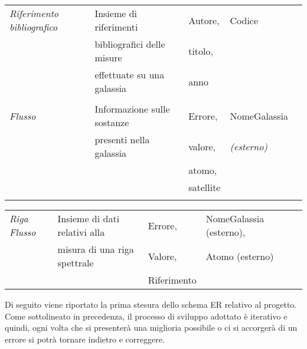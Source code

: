 \documentclass[12pt,a4paper,onecolumn,x11names]{article}
\begin{document}
\begin{table}[h!]
\begin{tabular}{lllll}
%
			\textit{Riferimento bibliografico}	& Insieme di riferimenti  & Autore,		&	Codice				\\
				& bibliografici delle misure  & titolo,		&					\\
			&effettuate su una galassia & anno		&					\\
			&						&				&					\\
			\textit{Flusso}			& Informazione sulle sostanze & Errore, 		& NomeGalassia \\
			& presenti nella galassia	&	valore,		& \textit{(esterno)}\\
			&							& atomo,		&					\\
			&							& satellite	&						\\
			&							&			&						\\
		\end{tabular}
	\end{table}
		
	\begin{table}
	\centering
		\begin{tabular}{lllll}
		\textit{Riga Flusso}	& Insieme di dati relativi alla  & Errore, & NomeGalassia (esterno),\\
		& misura di una riga spettrale & Valore,		&		Atomo (esterno)	\\
		&  & Riferimento		&				\\ 
		\end{tabular}
	\end{table}

	\begin{flushleft}
		Di seguito viene riportato la prima stesura dello schema ER relativo al progetto. Come sottolineato in precedenza, il processo di sviluppo adottato è iterativo e quindi, ogni volta che si presenterà una miglioria possibile o ci si accorgerà di un errore si potrà tornare indietro e correggere.
	\end{flushleft}
\end{document}

